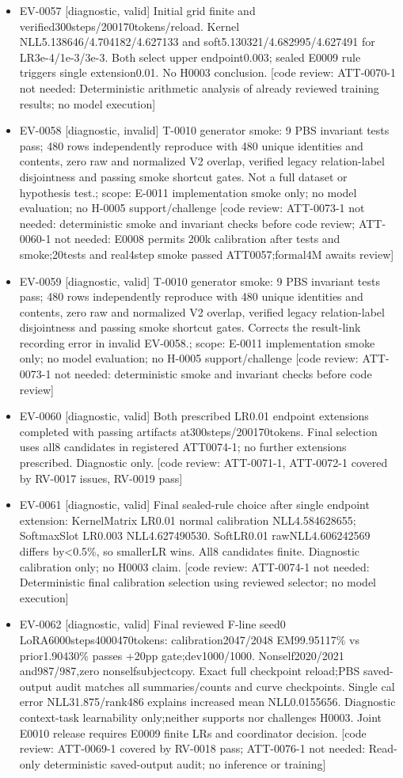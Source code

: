 \documentclass[11pt]{article}
\begin{document}
\begin{itemize}
\item EV-0057 [diagnostic, valid] Initial grid finite and verified300steps/200170tokens/reload. Kernel NLL5.138646/4.704182/4.627133 and soft5.130321/4.682995/4.627491 for LR3e-4/1e-3/3e-3. Both select upper endpoint0.003; sealed E0009 rule triggers single extension0.01. No H0003 conclusion. [code review: ATT-0070-1 not needed: Deterministic arithmetic analysis of already reviewed training results; no model execution]
\item EV-0058 [diagnostic, invalid] T-0010 generator smoke: 9 PBS invariant tests pass; 480 rows independently reproduce with 480 unique identities and contents, zero raw and normalized V2 overlap, verified legacy relation-label disjointness and passing smoke shortcut gates. Not a full dataset or hypothesis test.; scope: E-0011 implementation smoke only; no model evaluation; no H-0005 support/challenge [code review: ATT-0073-1 not needed: deterministic smoke and invariant checks before code review; ATT-0060-1 not needed: E0008 permits 200k calibration after tests and smoke;20tests and real4step smoke passed ATT0057;formal4M awaits review]
\item EV-0059 [diagnostic, valid] T-0010 generator smoke: 9 PBS invariant tests pass; 480 rows independently reproduce with 480 unique identities and contents, zero raw and normalized V2 overlap, verified legacy relation-label disjointness and passing smoke shortcut gates. Corrects the result-link recording error in invalid EV-0058.; scope: E-0011 implementation smoke only; no model evaluation; no H-0005 support/challenge [code review: ATT-0073-1 not needed: deterministic smoke and invariant checks before code review]
\item EV-0060 [diagnostic, valid] Both prescribed LR0.01 endpoint extensions completed with passing artifacts at300steps/200170tokens. Final selection uses all8 candidates in registered ATT0074-1; no further extensions prescribed. Diagnostic only. [code review: ATT-0071-1, ATT-0072-1 covered by RV-0017 issues, RV-0019 pass]
\item EV-0061 [diagnostic, valid] Final sealed-rule choice after single endpoint extension: KernelMatrix LR0.01 normal calibration NLL4.584628655; SoftmaxSlot LR0.003 NLL4.627490530. SoftLR0.01 rawNLL4.606242569 differs by\textless{}0.5\%, so smallerLR wins. All8 candidates finite. Diagnostic calibration only; no H0003 claim. [code review: ATT-0074-1 not needed: Deterministic final calibration selection using reviewed selector; no model execution]
\item EV-0062 [diagnostic, valid] Final reviewed F-line seed0 LoRA6000steps4000470tokens: calibration2047/2048 EM99.95117\% vs prior1.90430\% passes +20pp gate;dev1000/1000. Nonself2020/2021 and987/987,zero nonselfsubjectcopy. Exact full checkpoint reload;PBS saved-output audit matches all summaries/counts and curve checkpoints. Single cal error NLL31.875/rank486 explains increased mean NLL0.0155656. Diagnostic context-task learnability only;neither supports nor challenges H0003. Joint E0010 release requires E0009 finite LRs and coordinator decision. [code review: ATT-0069-1 covered by RV-0018 pass; ATT-0076-1 not needed: Read-only deterministic saved-output audit; no inference or training]

\end{itemize}
\end{document}
